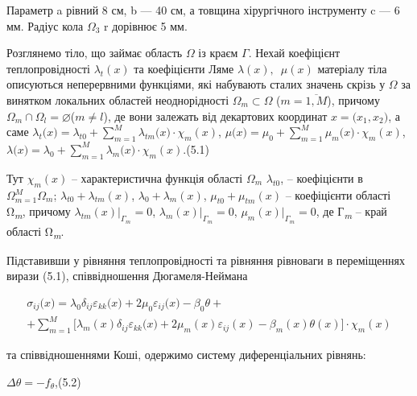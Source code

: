 \noindent Параметр a рівний 8 см, b --- 40 см, а товщина хірургічного інструменту c --- 6 мм. Радіус кола $\Omega_3$ r 
дорівнює 5 мм.

Розглянемо тіло, що займає область $\Omega$ із краєм $\Gamma$. Нехай коефіцієнт теплопровідності $\lambda_{t}(x)$ та
коефіцієнти Ляме $\lambda(x),\mspace{9mu}\mu(x)$ матеріалу тіла описуються неперервними функціями, які набувають сталих
значень скрізь у $\Omega$ за винятком локальних областей неоднорідності $\Omega_{m}\subset\Omega$ ($m =
\overline{1,M}$), причому ${\Omega_{m} \cap \Omega_{l}} = \varnothing$($m \neq l$), де вони залежать від декартових
координат ${x = (}x_{1},x_{2})$, а саме 
$\lambda_{t}(x{) = {\lambda_{t0} + {\sum\limits_{m = 1}^{M}{\lambda_{\mathit{\text{tm}}}(x{) \cdot \chi_{m}}(x)}}}}$,
$\mu(x{) = {\mu_{0} + {\sum\limits_{m = 1}^{M}{\mu_{m}(x{) \cdot \chi_{m}}(x)}}}}$,
$\lambda(x{) = {\lambda_{0} + {\sum\limits_{m = 1}^{M}{\lambda_{m}(x{) \cdot \chi_{m}}(x)}}}}$.(5.1)

Тут $\chi_{m}(x)$ -- характеристична функція області $\Omega_m$ $\lambda_{t0}$, -- коефіцієнти в $\Omega{}_{m =
1}^{M}\Omega_{m}$; ${\lambda_{t0} + \lambda_{\mathit{\text{tm}}}}(x)$, ${\lambda_{0} + \lambda_{m}}(x)$, ${\mu_{t0} +
\mu_{\mathit{\text{tm}}}}(x)$ -- коефіцієнти області Ω\textsubscript{\emph{m}}, причому
$\lambda_{\mathit{\text{tm}}}(x){|_{\Gamma_{m}} = 0}$, $\lambda_{m}(x){|_{\Gamma_{m}} = 0}$, $\mu_{m}(x){|_{\Gamma_{m}}
= 0}$, де Г\textsubscript{\emph{m}} -- край області Ω\textsubscript{\emph{m}}.

Підставивши у рівняння теплопровідності та рівняння рівноваги в переміщеннях вирази (5.1), співвідношення
Дюгамеля-Неймана

\begin{equation*}
    \begin{split}
        \sigma_{\mathit{\text{ij}}}(x{) = \lambda_{0}}\delta_{\mathit{\text{ij}}}\varepsilon_{\mathit{\text{kk}}}(x{) + 2}\mu_{0}
            \varepsilon_{\mathit{\text{ij}}}(x{) - \beta_{0}}\theta + \\ + {{\sum\limits_{m = 1}^{M}{\lbrack\lambda_{m}(x)\delta_{\mathit{\text{ij}}}
            \varepsilon_{\mathit{\text{kk}}}(x{) + 2}\mu_{m}(x)\varepsilon_{\mathit{\text{ij}}}(x)-\beta_{m}(x)\theta(x)\rbrack}} \cdot \chi_{m}}(x)
    \end{split}
\end{equation*}

\noindent та співвідношеннями Коші, одержимо систему диференціальних рівнянь:

$\mathit{\Delta\theta} = {- f_{\theta}}$,(5.2)

